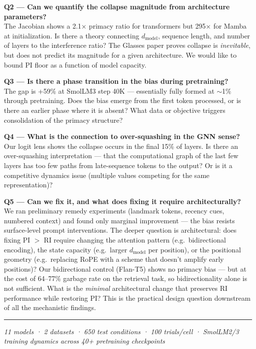 \documentclass[9pt, a4paper]{article}
\begin{document}
\textbf{Q2 — Can we quantify the collapse magnitude from architecture parameters?}\\
The Jacobian shows a 2.1× primacy ratio for transformers but 295× for Mamba at initialization. Is there a theory connecting $d_\text{model}$, sequence length, and number of layers to the interference ratio? The Glasses paper proves collapse is \textit{inevitable}, but does not predict its magnitude for a given architecture. We would like to bound PI floor as a function of model capacity.

\textbf{Q3 — Is there a phase transition in the bias during pretraining?}\\
The gap is +59\% at SmolLM3 step 40K — essentially fully formed at $\sim$1\% through pretraining. Does the bias emerge from the first token processed, or is there an earlier phase where it is absent? What data or objective triggers consolidation of the primacy structure?

\textbf{Q4 — What is the connection to over-squashing in the GNN sense?}\\
Our logit lens shows the collapse occurs in the final 15\% of layers. Is there an over-squashing interpretation — that the computational graph of the last few layers has too few paths from late-sequence tokens to the output? Or is it a competitive dynamics issue (multiple values competing for the same representation)?

\textbf{Q5 — Can we fix it, and what does fixing it require architecturally?}\\
We ran preliminary remedy experiments (landmark tokens, recency cues, numbered context) and found only marginal improvement — the bias resists surface-level prompt interventions. The deeper question is architectural: does fixing PI $>$ RI require changing the attention pattern (e.g.\ bidirectional encoding), the state capacity (e.g.\ larger $d_\text{model}$ per position), or the positional geometry (e.g.\ replacing RoPE with a scheme that doesn't amplify early positions)? Our bidirectional control (Flan-T5) shows no primacy bias — but at the cost of 64–77\% garbage rate on the retrieval task, so bidirectionality alone is not sufficient. What is the \textit{minimal} architectural change that preserves RI performance while restoring PI? This is the practical design question downstream of all the mechanistic findings.

\vfill
\noindent\rule{\linewidth}{0.4pt}
{\scriptsize \textit{11 models · 2 datasets · 650 test conditions · 100 trials/cell · SmolLM2/3 training dynamics across 40+ pretraining checkpoints}}
\end{document}
